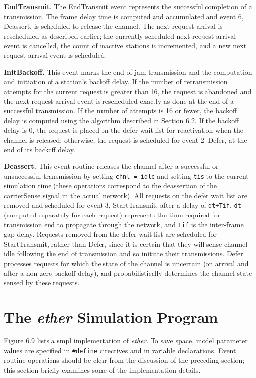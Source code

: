\noindent\textbf{EndTransmit.} The EndTransmit event represents the successful completion of a transmission. The frame delay time is computed and accumulated and event 6, Deassert, is scheduled to release the channel. The next request arrival is rescheduled as described earlier; the currently-scheduled next request arrival event is cancelled, the count of inactive stations is incremented, and a new next request arrival event is scheduled.

\noindent\textbf{InitBackoff.} This event marks the end of jam transmission and the computation and initiation of a station's backoff delay. If the number of retransmission attempts for the current request is greater than 16, the request is abandoned and the next request arrival event is rescheduled exactly as done at the end of a successful transmission. If the number of attempts is 16 or fewer, the backoff delay is computed using the algorithm described in Section 6.2. If the backoff delay is 0, the request is placed on the defer wait list for reactivation when the channel is released; otherwise, the request is scheduled for event 2, Defer, at the end of its backoff delay.

\noindent\textbf{Deassert.} This event routine releases the channel after a successful or unsuccessful transmission by setting \texttt{chnl = idle} and setting \texttt{tis} to the current simulation time (these operations correspond to the deassertion of the carrierSense signal in the actual network). All requests on the defer wait list are removed and scheduled for event 3, StartTransmit, after a delay of \texttt{dt+Tif}. \texttt{dt} (computed separately for each request) represents the time required for transmission end to propagate through the network, and \texttt{Tif} is the inter-frame gap delay. Requests removed from the defer wait list are scheduled for StartTransmit, rather than Defer, since it is certain that they will sense channel idle following the end of transmission and so initiate their transmissions. Defer processes requests for which the state of the channel is uncertain (on arrival and after a non-zero backoff delay), and probabilistically determines the channel state sensed by these requests.

\section{The \emph{ether} Simulation Program}

Figure 6.9 lists a smpl implementation of \emph{ether}. To save space, model parameter values are specified in \texttt{\#define} directives and in variable declarations. Event routine operations should be clear from the discussion of the preceding section; this section briefly examines some of the implementation details.

